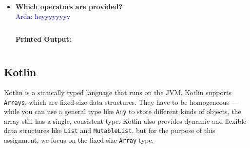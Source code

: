 \documentclass{article}
\newcommand{\arda}[1]{\textcolor{blue}{Arda: #1}}
\begin{document}
\begin{itemize}
\arda{gpt yapti editle}
\begin{lstlisting}[language=JavaScript]
console.log("\n\n5: Array Slice:");
arr1 = [1, 2, 3, 4, 5, 6, 7, 8, 9, 10];
let slice = arr1.slice(1, 3); // (begin, end)
console.log(slice); 
let slice2 = arr1.slice(3); // (begin)
console.log(slice2);
let slice3 = arr1.slice(-3); // (begin)
console.log(slice3); 
let slice4 = arr1.slice(3, -2); // (begin, end)
console.log(slice4);
let slice5 = arr1.slice(-3, -1); // (begin, end)
console.log(slice5);

// using a filter function
let filtered = arr1.filter((item) => item > 5);
console.log("Filtered values (item > 5):", filtered);
\end{lstlisting}
\textbf{Printed Output:}
\begin{verbatim}
5: Array Slice:
[ 2, 3 ]
[
  4, 5,  6, 7,
  8, 9, 10
]
[ 8, 9, 10 ]
[ 4, 5, 6, 7, 8 ]
[ 8, 9 ]
Filtered values (item > 5): [ 6, 7, 8, 9, 10 ]
\end{verbatim}



\item \textbf{Which operators are provided?} \\
\arda{heyyyyyyyy}
\begin{lstlisting}[language=JavaScript]
\end{lstlisting}
\textbf{Printed Output:}
\begin{verbatim}
\end{verbatim}
    
\end{itemize}
\newpage




\subsection{Kotlin}
Kotlin is a statically typed language that runs on the JVM. Kotlin supports \texttt{Arrays}, which are fixed-size data structures. They have to be homogeneous — while you can use a general type like \texttt{Any} to store different kinds of objects, the array still has a single, consistent type. Kotlin also provides dynamic and flexible data structures like \texttt{List} and \texttt{MutableList}, but for the purpose of this assignment, we focus on the fixed-size \texttt{Array} type.
\end{document}
